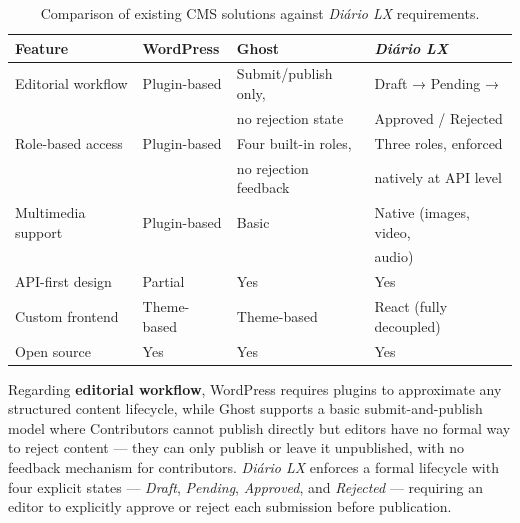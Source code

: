 \begin{table}[H]
      \centering
      \caption{Comparison of existing CMS solutions against \textit{Diário LX} requirements.}
      \label{tab:cms_comparison}
      \begin{tabularx}{\textwidth}{lXXX}
            \toprule
            \textbf{Feature}   & \textbf{WordPress} & \textbf{Ghost}        & \textbf{\textit{Diário LX}} \\
            \midrule
            Editorial workflow & Plugin-based       & Submit/publish only,  & Draft → Pending →           \\
                               &                    & no rejection state    & Approved / Rejected         \\
            \addlinespace
            Role-based access  & Plugin-based       & Four built-in roles,  & Three roles, enforced       \\
                               &                    & no rejection feedback & natively at API level       \\
            \addlinespace
            Multimedia support & Plugin-based       & Basic                 & Native (images, video,      \\
                               &                    &                       & audio)                      \\
            \addlinespace
            API-first design   & Partial            & Yes                   & Yes                         \\
            \addlinespace
            Custom frontend    & Theme-based        & Theme-based           & React (fully decoupled)     \\
            \addlinespace
            Open source        & Yes                & Yes                   & Yes                         \\
            \bottomrule
      \end{tabularx}
\end{table}

Regarding \textbf{editorial workflow}, WordPress requires plugins to approximate any
structured content lifecycle, while Ghost supports a basic submit-and-publish model
where Contributors cannot publish directly but editors have no formal way to reject
content --- they can only publish or leave it unpublished, with no feedback mechanism
for contributors. \textit{Diário LX} enforces a formal lifecycle with four explicit states ---
\textit{Draft}, \textit{Pending}, \textit{Approved}, and \textit{Rejected} ---
requiring an editor to explicitly approve or reject each submission before publication.

